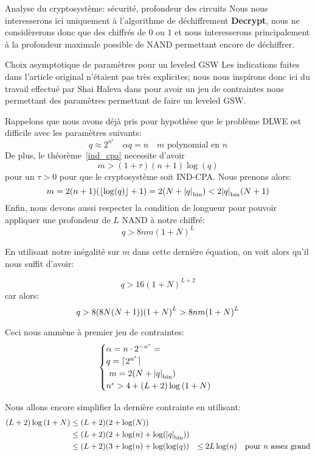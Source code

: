 \begin{section}{Analyse du cryptosystème: sécurité, profondeur des circuits}
	Nous nous interesserons ici uniquement à l'algorithme de déchiffrement
	\textbf{Decrypt}, nous ne considèrerons donc que des chiffrés de $0$ ou
	$1$ et nous interesserons principalement à la profondeur maximale 
	possible de NAND permettant encore de déchiffrer.

	\begin{subsection}{Choix asymptotique de paramètres pour un leveled GSW}
	\label{sec:leveled}
	\label{param_leveled}
	Les indications faites dans l'article original \cite{EPRINT:GenSahWat13} n'étaient pas très explicites; nous nous inspirons donc ici du travail
	effectué par Shai Haleva dans \cite{halevi} pour avoir un jeu de
	contraintes nous permettant des paramètres permettant de faire un
	leveled GSW. 

	Rappelons que nous avons déjà pris pour hypothèse que le problème DLWE est difficile avec les paramètres suivants:
	\[ q \approx 2^{n^\epsilon}\quad \alpha q = n\quad \text{$m$ polynomial en $n$}\]
	De plus, le théorème~\ref{ind_cpa} necessite d'avoir 
	\[m > (1+\tau)(n+1)\log(q) \]
	pour un $\tau > 0$ pour que le cryptosystème soit IND-CPA.  Nous prenons alors: 
	\[ m = 2(n+1)(\lfloor \log(q) \rfloor + 1) = 2(N + {|q|}_{\text{bin}}) < 2
	{|q|}_{\text{bin}} (N+1)\]
	Enfin, nous devons aussi respecter la condition de longueur pour pouvoir appliquer une profondeur de $L$ NAND à notre chiffré:
	\[q > 8nm (1 + N)^L \]

En utilisant notre inégalité sur $m$  dans cette dernière équation, on voit alors qu'il nous suffit d'avoir:

\begin{equation}
q > 16 {(1+N)}^{L+2}
\end{equation}
car alors:
\begin{equation}
q> 8 (8 N (N+1)) {(1 + N)}^{L} > 8 nm {(1 + N)}^L \\
\end{equation}

Ceci nous ammène à premier jeu de contraintes: 
\[ \begin{cases}\alpha  = n \cdot 2^{-n^\epsilon}=  \\
	q = \lceil 2^{n^\epsilon}\rceil\\ 
	m = 2(N + \bnorm{q}) \\  
	n^\epsilon > 4 + (L+2) \log\left( 1 + N\right)
	\end{cases} \]

Nous allons encore simplifier la dernière contrainte en utilisant:
\begin{align*} (L+2) \log\left( 1 + N\right) &\leq (L+2) (2 + \log(N)) \\
&\leq (L+2) (2 + \log(n) +  \log({|q|}_{\text{bin}})) \\
&\leq (L+2) (3 + \log(n) + \log(\log(q))
&\leq 2 L \log(n) \quad \text{pour $n$ assez grand}
\end{align*}


\end{subsection}
\end{section}
